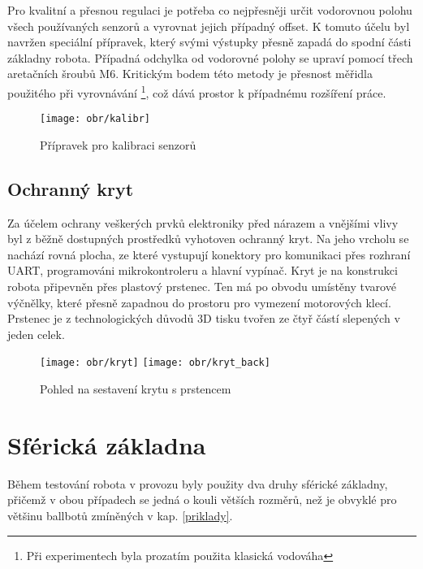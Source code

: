 Pro kvalitní a přesnou regulaci je potřeba co nejpřesněji určit vodorovnou polohu všech používaných senzorů a vyrovnat jejich případný offset. K tomuto účelu byl navržen speciální přípravek, který svými výstupky přesně zapadá do spodní části základny robota. Případná odchylka od vodorovné polohy se upraví pomocí třech aretačních šroubů M6. Kritickým bodem této metody je přesnost měřidla použitého při vyrovnávání \footnote{Při experimentech byla prozatím použita klasická vodováha}, což dává prostor k případnému rozšíření práce. 
\vspace{3mm}
\begin{figure}[hb]
\begin{center}
\texttt{[image: obr/kalibr]}
\end{center}
\caption{Přípravek pro kalibraci senzorů}
\label{pripravek}
\end{figure} 

\subsection{Ochranný kryt}
\label{pripravek}

Za účelem ochrany veškerých prvků elektroniky před nárazem a vnějšími vlivy byl z běžně dostupných prostředků vyhotoven ochranný kryt. Na jeho vrcholu se nachází rovná plocha, ze které vystupují konektory pro komunikaci přes rozhraní UART, programováni mikrokontroleru a hlavní vypínač. Kryt je na konstrukci robota připevněn přes plastový prstenec. Ten má po obvodu umístěny tvarové výčnělky, které přesně zapadnou do prostoru pro vymezení motorových klecí. Prstenec je z technologických důvodů 3D tisku tvořen ze čtyř částí slepených v jeden celek. 
\vspace{3mm}
\begin{figure}[hb]
\begin{center}
\texttt{[image: obr/kryt]}
\texttt{[image: obr/kryt\_back]}
\end{center}
\caption{Pohled na sestavení krytu s prstencem}
\label{kryt}
\end{figure} 

\newpage

\section{Sférická základna}
\label{sphere}

Během testování robota v provozu byly použity dva druhy sférické základny, přičemž v obou případech se jedná o kouli větších rozměrů, než je obvyklé pro většinu ballbotů zmíněných v kap. \ref{priklady}. 

